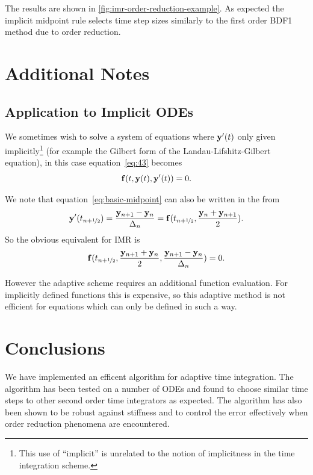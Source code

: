 The results are shown in \autoref{fig:imr-order-reduction-example}. 
As expected the implicit midpoint rule selects time step sizes similarly to the first order BDF1 method due to order reduction.


\section{Additional Notes}

\subsection{Application to Implicit ODEs}
\label{sec:extens-impl-odes}

We sometimes wish to solve a system of equations where $\mathbf{y}'(t)$ only given implicitly\footnote{This use of ``implicit'' is unrelated to the notion of implicitness in the time integration scheme.} (for example the Gilbert form of the Landau-Lifshitz-Gilbert equation), in this case equation~\eqref{eq:43} becomes
\begin{equation}
  {\mathbf{f}}(t, \mathbf{y}(t), \mathbf{y}'(t)) = 0.
\end{equation}

We note that equation~\eqref{eq:basic-midpoint} can also be written in the from
\begin{equation}
  \mathbf{y}'(t_{n+\nicefrac{1}{2}}) = \frac{\mathbf{y}_{n+1} - \mathbf{y}_n}{\Delta_{n}} =  {\mathbf{f}}(t_{n+\nicefrac{1}{2}}, \frac{\mathbf{y}_n + \mathbf{y}_{n+1}}{2}).
\end{equation}
So the obvious equivalent for IMR is
\begin{equation}
  {\mathbf{f}}(t_{n+\nicefrac{1}{2}}, \frac{\mathbf{y}_{n+1} + \mathbf{y}_n}{2}, \frac{\mathbf{y}_{n+1} - \mathbf{y}_n}{\Delta_{n}}) = 0.
\end{equation}

However the adaptive scheme requires an additional function evaluation.
For implicitly defined functions this is expensive, so this adaptive method is not efficient for equations which can only be defined in such a way.



\section{Conclusions}

We have implemented an efficent algorithm for adaptive time integration.
The algorithm has been tested on a number of ODEs and found to choose similar time steps to other second order time integrators as expected.
The algorithm has also been shown to be robust against stiffness and to control the error effectively when order reduction phenomena are encountered.


